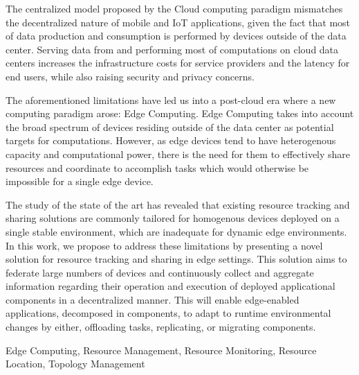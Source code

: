 

The centralized model proposed by the Cloud computing paradigm mismatches the decentralized nature of mobile and IoT applications, given the fact that most of data production and consumption is performed by devices outside of the data center. Serving data from and performing most of computations on cloud data centers increases the infrastructure costs for service providers and the latency for end users, while also raising security and privacy concerns. 

The aforementioned limitations have led us into a post-cloud era where a new computing paradigm arose: Edge Computing. Edge Computing takes into account the broad spectrum of devices residing outside of the data center as potential targets for computations. However, as edge devices tend to have heterogenous capacity and computational power, there is the need for them to effectively share resources and coordinate to accomplish tasks which would otherwise be impossible for a single edge device. 

The study of the state of the art has revealed that existing resource tracking and sharing solutions are commonly tailored for homogenous devices deployed on a single stable environment, which are inadequate for dynamic edge environments. In this work, we propose to address these limitations by presenting a novel solution for resource tracking and sharing in edge settings. This solution aims to federate large numbers of devices and continuously collect and aggregate information regarding their operation and
execution of deployed applicational components in a decentralized manner. This will enable edge-enabled applications, decomposed in components, to adapt to runtime environmental changes by either, offloading tasks, replicating, or migrating components.


\begin{keywords}

    Edge Computing, Resource Management, Resource Monitoring, Resource Location, Topology Management
    
\end{keywords}

